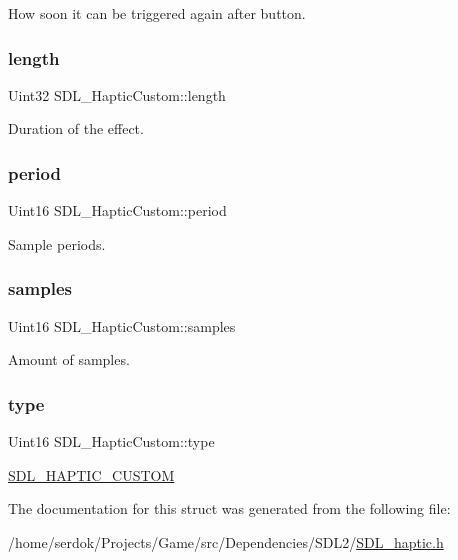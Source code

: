 How soon it can be triggered again after button. \mbox{\label{structSDL__HapticCustom_ad70e8bc2cff74b99d704a757c16b363f}} 
\subsubsection{\texorpdfstring{length}{length}}
{\footnotesize\ttfamily Uint32 S\+D\+L\+\_\+\+Haptic\+Custom\+::length}

Duration of the effect. \mbox{\label{structSDL__HapticCustom_aba7fafa808e90baddef25f009b8f4817}} 
\subsubsection{\texorpdfstring{period}{period}}
{\footnotesize\ttfamily Uint16 S\+D\+L\+\_\+\+Haptic\+Custom\+::period}

Sample periods. \mbox{\label{structSDL__HapticCustom_a5905ea1b6182da846535ca8c80b4fa33}} 
\subsubsection{\texorpdfstring{samples}{samples}}
{\footnotesize\ttfamily Uint16 S\+D\+L\+\_\+\+Haptic\+Custom\+::samples}

Amount of samples. \mbox{\label{structSDL__HapticCustom_a98a8995c94492069dc007502ed97eed2}} 
\subsubsection{\texorpdfstring{type}{type}}
{\footnotesize\ttfamily Uint16 S\+D\+L\+\_\+\+Haptic\+Custom\+::type}

\hyperlink{SDL__haptic_8h_a8a18c4de1076ac9bebd718329d16db29}{S\+D\+L\+\_\+\+H\+A\+P\+T\+I\+C\+\_\+\+C\+U\+S\+T\+OM} 

The documentation for this struct was generated from the following file\+:\begin{DoxyCompactItemize}
\item 
/home/serdok/\+Projects/\+Game/src/\+Dependencies/\+S\+D\+L2/\hyperlink{SDL__haptic_8h}{S\+D\+L\+\_\+haptic.\+h}\end{DoxyCompactItemize}
